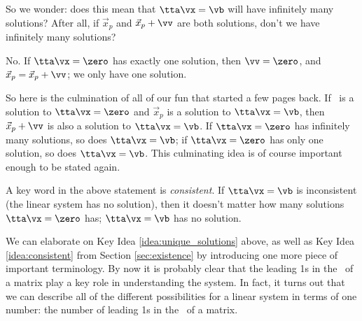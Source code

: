 So we wonder: does this mean that $\tta\vx = \vb$ will have infinitely many solutions? After all, if $\vec{x}_p$ and $\vec{x}_p+\vv$ are both solutions, don't we have infinitely many solutions?

No. If $\tta\vx = \zero$ has exactly one solution, then $\vv = \zero$, and $\vec{x}_p = \vec{x}_p +\vv$; we only have one solution.

So here is the culmination of all of our fun that started a few pages back. %
 If \vv\ is a solution to $\tta\vx=\zero$ and $\vec{x}_p$ is a solution to $\tta\vx=\vb$, then $\vec{x}_p+\vv$ is also a solution to $\tta\vx=\vb$. If $\tta\vx=\zero$ has infinitely many solutions, so does $\tta\vx = \vb$; if $\tta\vx=\zero$ has only one solution, so does $\tta\vx = \vb$. This culminating idea is of course important enough to be stated again.

\smallskip


\smallskip

A key word in the above statement is \textit{consistent}. If $\tta\vx = \vb$ is inconsistent (the linear system has no solution), then it doesn't matter how many solutions $\tta\vx = \zero$ has; $\tta\vx=\vb$ has no solution.

We can elaborate on Key Idea \ref{idea:unique_solutions} above, as well as Key Idea \ref{idea:consistent} from Section \ref{sec:existence} by introducing one more piece of important terminology. By now it is probably clear that the leading 1s in the \rref\ of a matrix play a key role in understanding the system. In fact, it turns out that we can describe all of the different possibilities for a linear system in terms of one number: the number of leading 1s in the \rref\ of a matrix.

\smallskip

